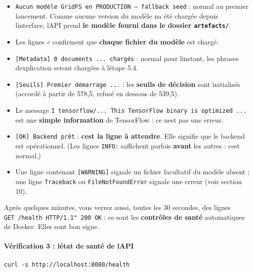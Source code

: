\documentclass[
  french,
  11pt,
  a4paper,
]{article}
\providecommand{\tightlist}{%
  \setlength{\itemsep}{0pt}\setlength{\parskip}{0pt}}
\begin{document}
\begin{itemize}
\tightlist
\item
  \texttt{Aucun\ modèle\ GridFS\ en\ PRODUCTION\ —\ fallback\ seed} :
  normal au premier lancement. Comme aucune version du modèle
  n\textquotesingle a été chargée depuis l\textquotesingle interface,
  l\textquotesingle API prend \textbf{le modèle fourni dans le dossier
  \texttt{artefacts/}}.
\item
  Les lignes \texttt{✓} confirment que \textbf{chaque fichier du modèle}
  est chargé.
\item
  \texttt{{[}Metadata{]}\ 0\ documents\ ...\ chargés} : normal pour
  l\textquotesingle instant, les phrases d\textquotesingle explication
  seront chargées à l\textquotesingle étape 5.4.
\item
  \texttt{{[}Seuils{]}\ Premier\ démarrage\ ...} : les \textbf{seuils de
  décision} sont initialisés (accordé à partir de 578,5, refusé en
  dessous de 539,5).
\item
  Le message
  \texttt{I\ tensorflow/\allowbreak{}.\allowbreak{}.\allowbreak{}.\allowbreak{}\ This\ TensorFlow\ binary\ is\ optimized\ .\allowbreak{}.\allowbreak{}.\allowbreak{}}
  est une \textbf{simple information} de TensorFlow : ce
  n\textquotesingle est pas une erreur.
\item
  \texttt{{[}OK{]}\ Backend\ prêt} : \textbf{c\textquotesingle est la
  ligne à attendre}. Elle signifie que le backend est opérationnel. (Les
  lignes \texttt{INFO:} s\textquotesingle affichent parfois
  \textbf{avant} les autres : c\textquotesingle est normal.)
\item
  Une ligne contenant \texttt{{[}WARNING{]}} signale un fichier
  facultatif du modèle absent ; une ligne \texttt{Traceback} ou
  \texttt{FileNotFoundError} signale une erreur (voir section 10).
\end{itemize}

Après quelques minutes, vous verrez aussi, toutes les 30 secondes, des
lignes
\texttt{GET\ /\allowbreak{}health\ HTTP/\allowbreak{}1.\allowbreak{}1"\ 200\ OK}
: ce sont les \textbf{contrôles de santé} automatiques de Docker. Elles
sont bon signe.

\paragraph{Vérification 3 : l\textquotesingle état de santé de
l\textquotesingle API}\label{vuxe9rification-3--luxe9tat-de-santuxe9-de-lapi}

\begin{Verbatim}[breaklines=true,breakanywhere=true,fontsize=\small,frame=leftline,framerule=1.6pt,rulecolor=\color{credixblue},framesep=3mm,xleftmargin=2mm,xrightmargin=1mm]
curl -s http://localhost:8080/health
\end{Verbatim}
\end{document}
